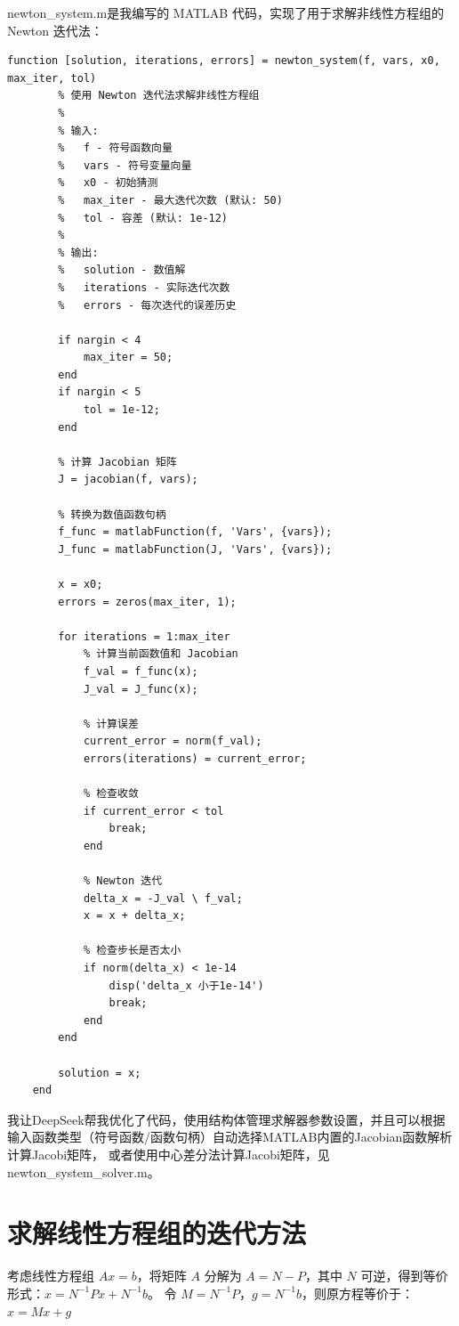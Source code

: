 newton\_system.m是我编写的 MATLAB 代码，实现了用于求解非线性方程组的 Newton 迭代法：
    \begin{lstlisting}[caption={newton\_system.m}]
    function [solution, iterations, errors] = newton_system(f, vars, x0, max_iter, tol)
        % 使用 Newton 迭代法求解非线性方程组
        % 
        % 输入:
        %   f - 符号函数向量
        %   vars - 符号变量向量  
        %   x0 - 初始猜测
        %   max_iter - 最大迭代次数 (默认: 50)
        %   tol - 容差 (默认: 1e-12)
        % 
        % 输出:
        %   solution - 数值解
        %   iterations - 实际迭代次数
        %   errors - 每次迭代的误差历史
        
        if nargin < 4
            max_iter = 50;
        end
        if nargin < 5
            tol = 1e-12;
        end
        
        % 计算 Jacobian 矩阵
        J = jacobian(f, vars);
        
        % 转换为数值函数句柄
        f_func = matlabFunction(f, 'Vars', {vars});
        J_func = matlabFunction(J, 'Vars', {vars});
        
        x = x0;
        errors = zeros(max_iter, 1);
        
        for iterations = 1:max_iter
            % 计算当前函数值和 Jacobian
            f_val = f_func(x);
            J_val = J_func(x);
            
            % 计算误差
            current_error = norm(f_val);
            errors(iterations) = current_error;
            
            % 检查收敛
            if current_error < tol
                break;
            end
            
            % Newton 迭代
            delta_x = -J_val \ f_val;
            x = x + delta_x;
            
            % 检查步长是否太小
            if norm(delta_x) < 1e-14
                disp('delta_x 小于1e-14')
                break;
            end
        end
    
        solution = x;
    end
    \end{lstlisting}

我让DeepSeek帮我优化了代码，使用结构体管理求解器参数设置，并且可以根据输入函数类型（符号函数/函数句柄）自动选择MATLAB内置的Jacobian函数解析计算Jacobi矩阵，
或者使用中心差分法计算Jacobi矩阵，见newton\_system\_solver.m。
\section{求解线性方程组的迭代方法}
考虑线性方程组 $Ax = b$，将矩阵 $A$ 分解为 $A = N - P$，其中 $N$ 可逆，得到等价形式：\(x = N^{-1}Px + N^{-1}b\)。
令 $M = N^{-1}P$，$g = N^{-1}b$，则原方程等价于：
\(x = Mx + g\)

